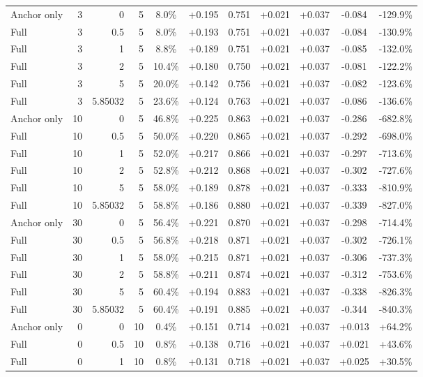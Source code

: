 \begin{table}[htbp]
\begin{tabular}{lrrrccccccc}
Anchor only & 3 & 0 & 5 & 8.0\% & +0.195 & 0.751 & +0.021 & +0.037 & -0.084 & -129.9\% \\
Full & 3 & 0.5 & 5 & 8.0\% & +0.193 & 0.751 & +0.021 & +0.037 & -0.084 & -130.9\% \\
Full & 3 & 1 & 5 & 8.8\% & +0.189 & 0.751 & +0.021 & +0.037 & -0.085 & -132.0\% \\
Full & 3 & 2 & 5 & 10.4\% & +0.180 & 0.750 & +0.021 & +0.037 & -0.081 & -122.2\% \\
Full & 3 & 5 & 5 & 20.0\% & +0.142 & 0.756 & +0.021 & +0.037 & -0.082 & -123.6\% \\
Full & 3 & 5.85032 & 5 & 23.6\% & +0.124 & 0.763 & +0.021 & +0.037 & -0.086 & -136.6\% \\
Anchor only & 10 & 0 & 5 & 46.8\% & +0.225 & 0.863 & +0.021 & +0.037 & -0.286 & -682.8\% \\
Full & 10 & 0.5 & 5 & 50.0\% & +0.220 & 0.865 & +0.021 & +0.037 & -0.292 & -698.0\% \\
Full & 10 & 1 & 5 & 52.0\% & +0.217 & 0.866 & +0.021 & +0.037 & -0.297 & -713.6\% \\
Full & 10 & 2 & 5 & 52.8\% & +0.212 & 0.868 & +0.021 & +0.037 & -0.302 & -727.6\% \\
Full & 10 & 5 & 5 & 58.0\% & +0.189 & 0.878 & +0.021 & +0.037 & -0.333 & -810.9\% \\
Full & 10 & 5.85032 & 5 & 58.8\% & +0.186 & 0.880 & +0.021 & +0.037 & -0.339 & -827.0\% \\
Anchor only & 30 & 0 & 5 & 56.4\% & +0.221 & 0.870 & +0.021 & +0.037 & -0.298 & -714.4\% \\
Full & 30 & 0.5 & 5 & 56.8\% & +0.218 & 0.871 & +0.021 & +0.037 & -0.302 & -726.1\% \\
Full & 30 & 1 & 5 & 58.0\% & +0.215 & 0.871 & +0.021 & +0.037 & -0.306 & -737.3\% \\
Full & 30 & 2 & 5 & 58.8\% & +0.211 & 0.874 & +0.021 & +0.037 & -0.312 & -753.6\% \\
Full & 30 & 5 & 5 & 60.4\% & +0.194 & 0.883 & +0.021 & +0.037 & -0.338 & -826.3\% \\
Full & 30 & 5.85032 & 5 & 60.4\% & +0.191 & 0.885 & +0.021 & +0.037 & -0.344 & -840.3\% \\
Anchor only & 0 & 0 & 10 & 0.4\% & +0.151 & 0.714 & +0.021 & +0.037 & +0.013 & +64.2\% \\
Full & 0 & 0.5 & 10 & 0.8\% & +0.138 & 0.716 & +0.021 & +0.037 & +0.021 & +43.6\% \\
Full & 0 & 1 & 10 & 0.8\% & +0.131 & 0.718 & +0.021 & +0.037 & +0.025 & +30.5\% \\

\end{tabular}
\end{table}
